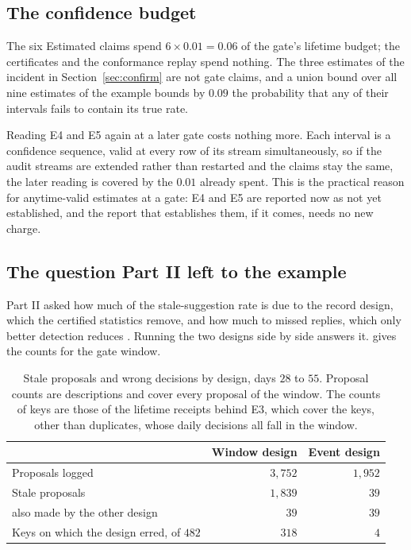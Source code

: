 \documentclass[11pt]{article}
\theoremstyle{definition}
\theoremstyle{plain}
\begin{document}
\subsection{The confidence budget}\label{sec:budget}

The six Estimated claims spend $6\times 0.01=0.06$ of the gate's lifetime budget; the certificates
and the conformance replay spend nothing. The three estimates of the incident in
Section~\ref{sec:confirm} are not gate claims, and a union bound over all nine estimates of the
example bounds by $0.09$ the probability that any of their intervals fails to contain its true
rate.

Reading E4 and E5 again at a later gate costs nothing more. Each interval is a confidence sequence,
valid at every row of its stream simultaneously, so if the audit streams are extended rather than
restarted and the claims stay the same, the later reading is covered by the $0.01$ already spent.
This is the practical reason for anytime-valid estimates at a gate: E4 and E5 are reported now as not
yet established, and the report that establishes them, if it comes, needs no new charge.

\subsection{The question Part II left to the example}\label{sec:question}

Part II asked how much of the stale-suggestion rate is due to the record design, which the
certified statistics remove, and how much to missed replies, which only better detection reduces
\cite[Section~9]{part2}. Running the two designs side by side answers it.  gives
the counts for the gate window.

\begin{table}[ht]
\centering\small
\begin{tabular}{lrr}
\toprule
 & Window design & Event design\\
\midrule
Proposals logged & $3{,}752$ & $1{,}952$\\
Stale proposals & $1{,}839$ & $39$\\
\quad also made by the other design & $39$ & $39$\\
Keys on which the design erred, of $482$ & $318$ & $4$\\
\bottomrule
\end{tabular}
\caption{Stale proposals and wrong decisions by design, days $28$ to $55$. Proposal counts are
descriptions and cover every proposal of the window. The counts of keys are those of the lifetime
receipts behind E3, which cover the keys, other than duplicates, whose daily decisions all fall in
the window.}\label{tab:split}
\end{table}
\end{document}

